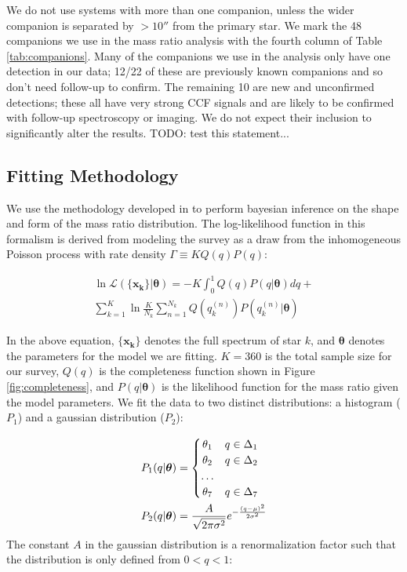 \documentclass{emulateapj}
\renewcommand{\vec}[1]{\bm{#1}}
\begin{document}
We do not use systems with more than one companion, unless the wider companion is separated by $ > 10''$ from the primary star. We mark the 48 companions we use in the mass ratio analysis with the fourth column of Table \ref{tab:companions}. Many of the companions we use in the analysis only have one detection in our data; 12/22 of these are previously known companions and so don't need follow-up to confirm. The remaining 10 are new and unconfirmed detections; these all have very strong CCF signals and are likely to be confirmed with follow-up spectroscopy or imaging. We do not expect their inclusion to significantly alter the results. TODO: test this statement...

\subsection{Fitting  Methodology}

We use the methodology developed in \citet{Foreman2014} to perform bayesian inference on the shape and form of the mass ratio distribution. The log-likelihood function in this formalism is derived from modeling the survey as a draw from the inhomogeneous Poisson process with rate density $\Gamma \equiv KQ(q)P(q)$:

\begin{multline}
\ln{\mathcal{L}(\{\vec{x_k}\}| \vec{\theta})} = -K \int_0^1 Q(q)P(q|\vec{\theta})dq + \\ \sum_{k=1}^K \ln{\frac{K}{N_k} \sum_{n=1}^{N_k} Q(q_k^{(n)}) P(q_k^{(n)}|\vec{\theta})}
\label{eqn:money}
\end{multline}

In the above equation, $\{\vec{x_k}\}$ denotes the full spectrum of star $k$, and $\vec{\theta}$ denotes the parameters for the model we are fitting. $K=360$ is the total sample size for our survey, $Q(q)$ is the completeness function shown in Figure \ref{fig:completeness}, and $P(q|\vec{\theta})$ is the likelihood function for the mass ratio given the model parameters. We fit the data to two distinct distributions: a histogram ($P_1$) and a gaussian distribution ($P_2$):

\begin{align}
 P_1(q|\vec{\theta}) &= \begin{cases}
      \hfill \theta_1 \hfill & q \in \Delta_1 \\
      \hfill \theta_2 \hfill & q \in \Delta_2 \\
      \hfill \ldots \\
      \hfill \theta_7 \hfill & q \in \Delta_7
     \end{cases} \label{eqn:P1} \\
 P_2(q|\vec{\theta}) &= \frac{A}{\sqrt{2\pi\sigma^2}} e^{-\frac{(q - \mu)^2}{2\sigma^2}} \label{eqn:P2}
\end{align}
The constant $A$ in the gaussian distribution is a renormalization factor such that the distribution is only defined from $0 < q < 1$:
\end{document}
